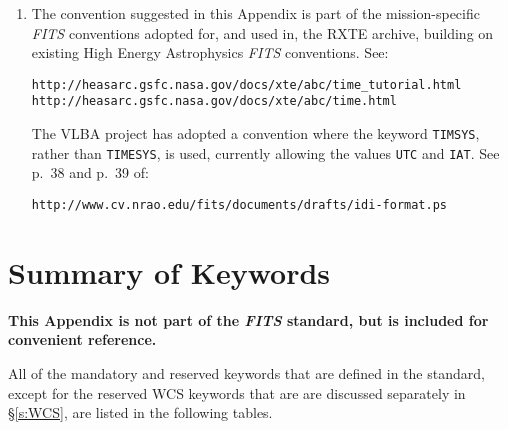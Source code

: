 \documentclass[11pt,makeidx]{book}     %
\begin{document}
\begin{enumerate}
\begin{footnotesize}
\begin{verbatim}
DATE-OBS= '1996-10-14'         / Date of start of observation, also in UTC.
 
TIMESYS = 'TT      '           / Explicit time scale specification: TT.
DATE-OBS= '1996-10-14T10:14:36.123' / Date and time of start of obs. in TT.
\end{verbatim}
\end{footnotesize}
 
\item The convention suggested in this Appendix is part of the mission-specific
   {\em FITS\/} conventions adopted for, and used in,
   the RXTE archive, building on
   existing High Energy Astrophysics {\em FITS\/} conventions.  See:
      \begin{center}
      {\tt http://heasarc.gsfc.nasa.gov/docs/xte/abc/time\_tutorial.html}
      {\tt http://heasarc.gsfc.nasa.gov/docs/xte/abc/time.html}
      \end{center}
   The VLBA project has adopted a convention where the 
   keyword {\tt TIMSYS}, rather than {\tt TIMESYS}, is used,
   currently allowing the values {\tt UTC} and {\tt IAT}.
   See p.~38 and p.~39 of:
   \begin{center}
       {\tt  http://www.cv.nrao.edu/fits/documents/drafts/idi-format.ps}
   \end{center}
\end{enumerate}


\chapter{Summary of Keywords}
   \label{s:summ} 
   {\bf This Appendix is not part of the {\em FITS\/} standard, 
   but is included for convenient reference.}
   
   All of the mandatory and reserved keywords that are defined in the standard,
   except  for the reserved WCS keywords that are are discussed separately in 
   \S\ref{s:WCS}, are listed in the following tables.  

\small  
\end{document}
